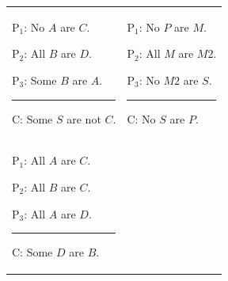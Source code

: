 \begin{exercises}
\begin{longtabu}{X[1,p,m]X[1,p,m]} 
\item \begin{earg}
\item[P$_1$:] No $A$ are $C$.
\item[P$_2$:] All $B$ are $D$.
\item[P$_3$:] Some $B$ are $A$.
\vspace{-.5em}
\item [] \rule{0.6\linewidth}{.5pt} 
\item[C:] Some $S$ are not $C$.
\end{earg} 
%
%
&
\item\begin{earg}
\item[P$_1$:] No $P$ are $M$.
\item[P$_2$:] All $M$ are $M2$.
\item[P$_3$:] No $M2$ are $S$.
\vspace{-.5em}
\item [] \rule{0.6\linewidth}{.5pt} 
\item[C:] No $S$ are $P$.
\end{earg}
%
%
\\
\item\begin{earg}
\item[P$_1$:] All $A$ are $C$.
\item[P$_2$:] All $B$ are $C$.
\item[P$_3$:] All $A$ are $D$.
\vspace{-.5em}
\item [] \rule{0.6\linewidth}{.5pt} 
\item[C:] Some $D$ are $B$.
\end{earg}



\end{longtabu}
\end{exercises}
